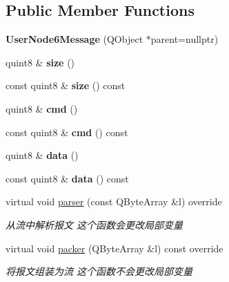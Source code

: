 \subsection*{Public Member Functions}
\begin{DoxyCompactItemize}
\item 
\mbox{\label{class_user_node6_message_a341c14edd68550b74554283fe2a45c39}} 
{\bfseries User\+Node6\+Message} (Q\+Object $\ast$parent=nullptr)
\item 
\mbox{\label{class_user_node6_message_a7a8b36e3e0ffec14292f53e65278065a}} 
quint8 \& {\bfseries size} ()
\item 
\mbox{\label{class_user_node6_message_ac0080041bc32075b773e815d2773165d}} 
const quint8 \& {\bfseries size} () const
\item 
\mbox{\label{class_user_node6_message_aae20969f61dbfecaee6bc482b66e6ac3}} 
quint8 \& {\bfseries cmd} ()
\item 
\mbox{\label{class_user_node6_message_ab0fd6f796718ce2b78677a380e89ac7e}} 
const quint8 \& {\bfseries cmd} () const
\item 
\mbox{\label{class_user_node6_message_acd4a1482534ccf765d090fbf5770b7e0}} 
quint8 \& {\bfseries data} ()
\item 
\mbox{\label{class_user_node6_message_a1296a7d899b230d98a1f1e6089ffffc2}} 
const quint8 \& {\bfseries data} () const
\item 
virtual void \mbox{\hyperlink{class_user_node6_message_a4970e84895482289ed59f6425404eb5e}{parser}} (const Q\+Byte\+Array \&l) override
\begin{DoxyCompactList}\small\item\em 从流中解析报文 这个函数会更改局部变量 \end{DoxyCompactList}\item 
virtual void \mbox{\hyperlink{class_user_node6_message_a01e9871b932acec420b34c8c77746715}{packer}} (Q\+Byte\+Array \&l) const override
\begin{DoxyCompactList}\small\item\em 将报文组装为流 这个函数不会更改局部变量 \end{DoxyCompactList}\end{DoxyCompactItemize}


